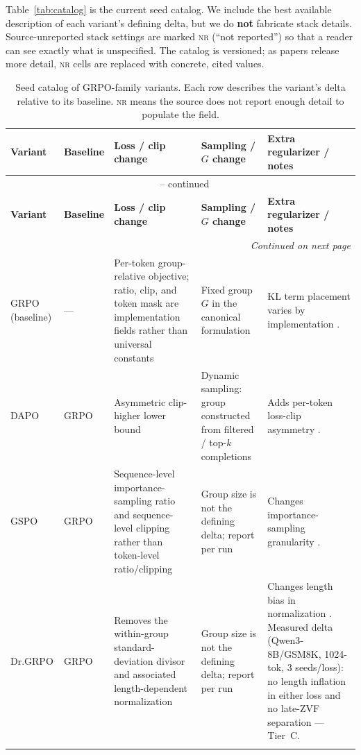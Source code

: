 \documentclass[11pt]{article}
\newcommand{\nr}{\textsc{nr}}
\newcommand{\grpo}{\textsc{GRPO}}
\begin{document}
Table~\ref{tab:catalog} is the current seed catalog. We include the best
available description of each variant's defining delta, but we do \textbf{not}
fabricate stack details. Source-unreported stack settings are marked \nr{}
(``not reported'') so that a reader can see exactly what is unspecified. The
catalog is versioned; as papers release more detail, \nr{} cells are replaced
with concrete, cited values.

\begin{longtable}{@{}p{2.1cm}p{2.4cm}p{3.0cm}p{2.0cm}p{3.3cm}@{}}
\caption{Seed catalog of \grpo{}-family variants. Each row describes the
  variant's delta relative to its baseline. \nr{} means the source does not
  report enough detail to populate the field.}\\
\toprule
\textbf{Variant} & \textbf{Baseline} & \textbf{Loss / clip change} &
\textbf{Sampling / $G$ change} & \textbf{Extra regularizer / notes}\\
\midrule
\endfirsthead
\multicolumn{5}{c}{\tablename\ \thetable{} -- continued}\\
\toprule
\textbf{Variant} & \textbf{Baseline} & \textbf{Loss / clip change} &
\textbf{Sampling / $G$ change} & \textbf{Extra regularizer / notes}\\
\midrule
\endhead
\midrule
\multicolumn{5}{r}{\textit{Continued on next page}}\\
\endfoot
\bottomrule
\endlastfoot

\grpo{} (baseline) & --- & Per-token group-relative objective; ratio, clip,
  and token mask are implementation fields rather than universal constants &
  Fixed group $G$ in the canonical formulation & KL term placement varies by
  implementation \cite{zvfaudit2026}.\\
\addlinespace

DAPO & \grpo{} & Asymmetric clip-higher lower bound & Dynamic sampling:
  group constructed from filtered / top-$k$ completions & Adds per-token
  loss-clip asymmetry \cite{yu2025dapo}.\\
\addlinespace

GSPO & \grpo{} & Sequence-level importance-sampling ratio and sequence-level
  clipping rather than token-level ratio/clipping & Group size is not the
  defining delta; report per run & Changes
  importance-sampling granularity \cite{qwen2025gspo}.\\
\addlinespace

Dr.\grpo{} & \grpo{} & Removes the within-group standard-deviation divisor and
  associated length-dependent normalization & Group size is not the defining
  delta; report per run & Changes
  length bias in normalization \cite{tong2025drgrpo}. Measured delta
  (Qwen3-8B/GSM8K, 1024-tok, 3 seeds/loss): no length inflation in either
  loss and no late-ZVF separation --- Tier~C.\\
\addlinespace


\end{longtable}
\end{document}
